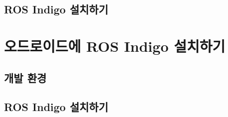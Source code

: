 \subsection{ROS Indigo 설치하기}


\section{오드로이드에 ROS Indigo 설치하기}

\subsection{개발 환경}

\subsection{ROS Indigo 설치하기}








































































